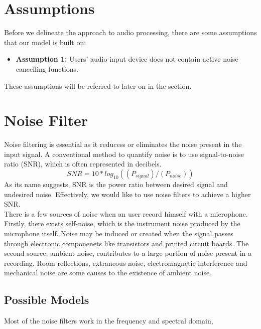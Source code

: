 \section{Assumptions}
Before we delineate the approach to audio processing, there are some assumptions that our model
is built on:
\begin{itemize}
	\item \textbf{Assumption 1:} Users' audio input device does not contain active noise cancelling functions.
\end{itemize}

These assumptions will be referred to later on in the section.

\section{Noise Filter}
Noise filtering is essential as it reducess or eliminates the noise present in the input signal.
A conventional method to quantify noise is to use signal-to-noise ratio (SNR), which is often 
represented in decibels.
\[SNR=10*log_10((P_{signal})/(P_{noise}))\]
As its name suggests, SNR is the power ratio between desired signal and undesired noise. Effectively,
we would like to use noise filters to achieve a higher SNR.\\ 
There is a few sources of noise when an user record himself with a microphone.
Firstly, there exists self-noise, which is the instrument noise produced by the microphone itself.
Noise may be induced or created when the signal passes through electronic componenets like transistors 
and printed circuit boards.\cite{selfnoise} 
The second source, ambient noise, contributes to a large portion of noise present in a recording.
Room reflections, extraneous noise, electromagnetic interference and mechanical noise are some causes 
to the existence of ambient noise. 
\subsection{Possible Models}
Most of the noise filters work in the frequency and spectral domain, 

